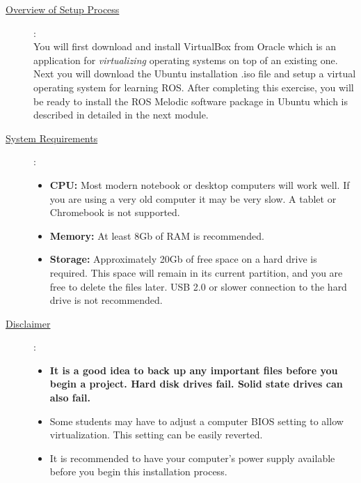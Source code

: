 \documentclass[12pt]{article}
\newcommand{\R}{\color{red}}
\begin{document}
\begin{description}
	\item[\underline{Overview of Setup Process}]: \vspace{0mm} \\

		        You will first download and install VirtualBox from Oracle which is an application for {\it virtualizing} operating systems on top of an existing one. Next you will download the Ubuntu installation .iso file and setup a virtual operating system for learning ROS.  After completing this exercise, you will be ready to install the ROS Melodic software package in Ubuntu which is described in detailed in the next module. 

	\item[\underline{System Requirements}]: \vspace{0mm} \\

		        \begin{itemize}

					\item {\bf CPU:} Most modern notebook or desktop computers will work well. If you are using a very old computer it may be very slow. A tablet or Chromebook is not supported.
					\item {\bf Memory:} At least 8Gb of RAM is recommended.        
                    \item {\bf Storage:} Approximately 20Gb of free space on a hard drive is required. This space will remain in its current partition, and you are free to delete the files later. USB 2.0 or slower connection to the hard drive is not recommended. 
    
                \end{itemize}
                
			\item[\underline{Disclaimer}]: 
			\begin{itemize}
			
				\item {\bf \R It is a good idea to back up any important files before you begin a project. Hard disk drives fail. Solid state drives can also fail. } 
				\item Some students may have to adjust a computer BIOS setting to allow virtualization. This setting can be easily reverted.   
				\item It is recommended to have your computer's power supply available before you begin this installation process. 
			
			\end{itemize} 			
			

\end{description}
\end{document}
